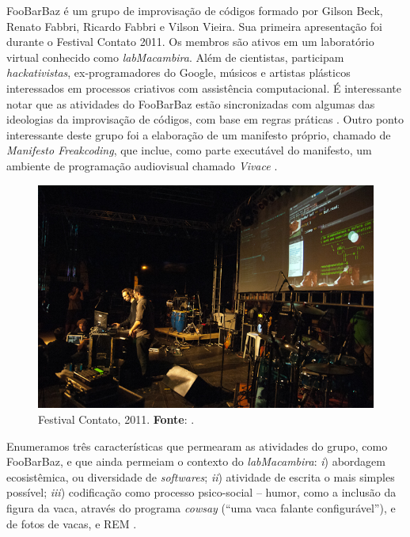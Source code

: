 FooBarBaz é um grupo de improvisação de códigos formado por Gilson Beck, Renato Fabbri, Ricardo Fabbri e Vilson Vieira. Sua primeira apresentação foi durante o Festival Contato 2011. Os membros são ativos em um laboratório virtual conhecido como \emph{labMacambira}. Além de cientistas, participam \emph{hackativistas}, ex-programadores do Google, músicos e artistas plásticos interessados em processos criativos com assistência computacional. É interessante notar que as atividades do FooBarBaz estão sincronizadas com algumas das ideologias da improvisação de códigos, com base em regras práticas . Outro ponto interessante deste grupo foi a elaboração de um manifesto próprio, chamado de \emph{Manifesto Freakcoding}, que inclue, como parte executável do manifesto, um ambiente de programação audiovisual chamado \emph{Vivace} \cite{vieira_vivace:_2015}.
 
\begin{figure}[!h]
  \centering
  \includegraphics[scale=0.71]{imagens/Foobarbaz1.jpg}
  \caption{Festival Contato, 2011. \textbf{Fonte}: .}
  \label{fig:foobarbaz}
\end{figure}

Enumeramos três características que permearam as atividades do grupo, como FooBarBaz, e que ainda permeiam o contexto do \emph{labMacambira}: \emph{i}) abordagem ecosistêmica, ou diversidade de \emph{softwares}; \emph{ii}) atividade de escrita o mais simples possível; \emph{iii}) codificação como processo psico-social -- humor, como a inclusão da figura da vaca, através do programa \emph{cowsay} (``uma vaca falante configurável''), e de fotos de vacas, e REM . 

